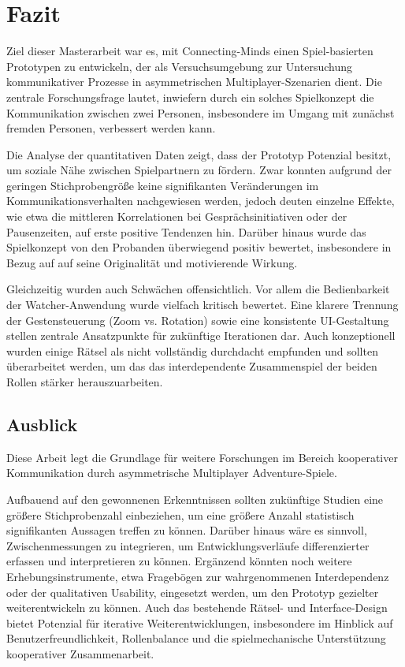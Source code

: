 \chapter{Fazit}

Ziel dieser Masterarbeit war es, mit Connecting-Minds einen Spiel-basierten Prototypen zu entwickeln, der als Versuchsumgebung zur Untersuchung kommunikativer Prozesse in asymmetrischen Multiplayer-Szenarien dient. Die zentrale Forschungsfrage lautet, inwiefern durch ein solches Spielkonzept die Kommunikation zwischen zwei Personen, insbesondere im Umgang mit zunächst fremden Personen, verbessert werden kann.

Die Analyse der quantitativen Daten zeigt, dass der Prototyp Potenzial besitzt, um soziale Nähe zwischen Spielpartnern zu fördern. Zwar konnten aufgrund der geringen Stichprobengröße keine signifikanten Veränderungen im Kommunikationsverhalten nachgewiesen werden, jedoch deuten einzelne Effekte, wie etwa die mittleren Korrelationen bei Gesprächsinitiativen oder der Pausenzeiten, auf erste positive Tendenzen hin. Darüber hinaus wurde das Spielkonzept von den Probanden überwiegend positiv bewertet, insbesondere in Bezug auf auf seine Originalität und motivierende Wirkung.

Gleichzeitig wurden auch Schwächen offensichtlich. Vor allem die Bedienbarkeit der Watcher-Anwendung wurde vielfach kritisch bewertet. Eine klarere Trennung der Gestensteuerung (Zoom vs. Rotation) sowie eine konsistente UI-Gestaltung stellen zentrale Ansatzpunkte für zukünftige Iterationen dar. Auch konzeptionell wurden einige Rätsel als nicht vollständig durchdacht empfunden und sollten überarbeitet werden, um das das interdependente Zusammenspiel der beiden Rollen stärker herauszuarbeiten.

\section{Ausblick}\label{sec:prospect}

Diese Arbeit legt die Grundlage für weitere Forschungen im Bereich kooperativer Kommunikation durch asymmetrische Multiplayer Adventure-Spiele.

Aufbauend auf den gewonnenen Erkenntnissen sollten zukünftige Studien eine größere Stichprobenzahl einbeziehen, um eine größere Anzahl statistisch signifikanten Aussagen treffen zu können. Darüber hinaus wäre es sinnvoll, Zwischenmessungen zu integrieren, um Entwicklungsverläufe differenzierter erfassen und interpretieren zu können. Ergänzend könnten noch weitere Erhebungsinstrumente, etwa Fragebögen zur wahrgenommenen Interdependenz oder der qualitativen Usability, eingesetzt werden, um den Prototyp gezielter weiterentwickeln zu können. Auch das bestehende Rätsel- und Interface-Design bietet Potenzial für iterative Weiterentwicklungen, insbesondere im Hinblick auf Benutzerfreundlichkeit, Rollenbalance und die spielmechanische Unterstützung kooperativer Zusammenarbeit.

